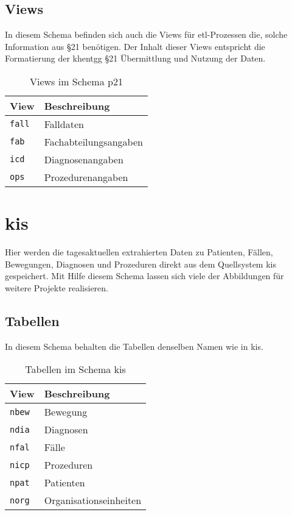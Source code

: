\subsection{Views}
In diesem Schema befinden sich auch die Views für \ac{etl}-Prozessen die, solche Information aus \S21 benötigen. Der Inhalt dieser Views entspricht die Formatierung der \ac{khentgg} \S 21 Übermittlung und Nutzung der Daten.
     	\begin{table}[ht]
     	\centering   
    	\caption{Views im Schema p21}
     	\begin{tabular}{||l|l||}
     	
     		\hline
     		View & Beschreibung \\ [0.5ex]
     		\hline\hline
     		\texttt{fall} & Falldaten \\
     		\hline
     		\texttt{fab} & Fachabteilungsangaben \\
     		\hline
     		\texttt{icd} & Diagnosenangaben \\
     		\hline
     		\texttt{ops} & Prozedurenangaben \\
     		\hline
     	\end{tabular}
    \end{table}

  \section{kis}
   Hier werden die tagesaktuellen extrahierten Daten zu Patienten, Fällen, Bewegungen, Diagnosen und Prozeduren direkt aus dem Quellsystem \ac{kis} gespeichert. Mit Hilfe diesem Schema lassen sich viele der Abbildungen für weitere Projekte realisieren.
  
   \subsection{Tabellen}
  In diesem Schema behalten die Tabellen denselben Namen wie in \ac{kis}. 
   \begin{table}[ht]
   	\centering   
   	\caption{Tabellen im Schema kis}
   	\begin{tabular}{||l|l||}   		
   		\hline
   		View & Beschreibung \\ [0.5ex]
   		\hline\hline
   		\texttt{nbew} & Bewegung \\
   		\hline
   		\texttt{ndia} & Diagnosen \\
   		\hline
   		\texttt{nfal} & Fälle \\
   		\hline
   		\texttt{nicp} & Prozeduren \\
   		\hline
   		\texttt{npat} & Patienten \\
   		\hline
   		\texttt{norg} & Organisationseinheiten \\
   		\hline
   	\end{tabular}
   \end{table}
  
